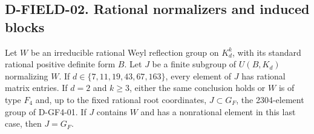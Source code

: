 \subsection*{D-FIELD-02. Rational normalizers and induced blocks}

\begin{lemma}\label{lem:weyl-normalizer}
Let \(W\) be an irreducible rational Weyl reflection group on
\(K_d^k\), with its standard rational positive definite form \(B\).
Let \(J\) be a finite subgroup of \(U(B,K_d)\) normalizing \(W\).
If \(d\in\{7,11,19,43,67,163\}\), every element of \(J\) has rational
matrix entries. If \(d=2\) and \(k\ge3\), either the same conclusion
holds or \(W\) is of type \(F_4\) and, up to the fixed rational
root coordinates, \(J\subset G_F\), the 2304-element group of D-GF4-01.
If \(J\) contains \(W\) and has a nonrational element in this last
case, then \(J=G_F\).
\end{lemma}


